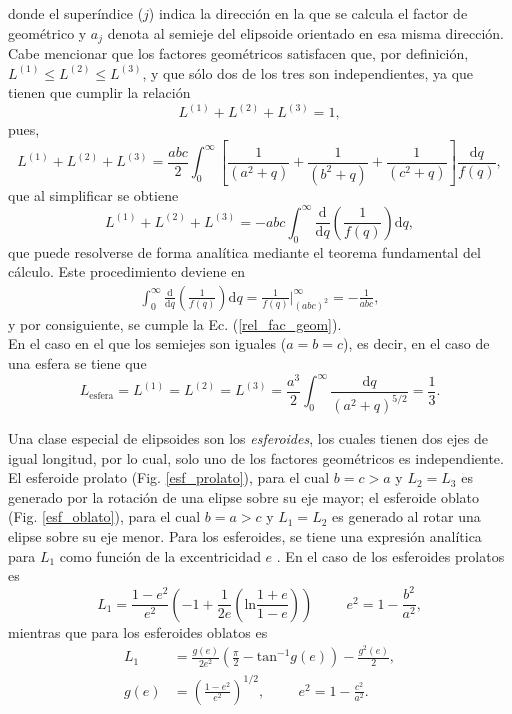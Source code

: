 donde el superíndice ($j$) indica la dirección en la que se calcula el factor de geométrico y $a_j$ denota al semieje del elipsoide orientado en esa misma dirección. Cabe mencionar que los factores geométricos  satisfacen que, por definición, $L^{(1)}\leq L^{(2)}\leq L^{(3)}$, y que sólo dos de los tres son independientes, ya que tienen que cumplir la relación 
\begin{equation}
    L^{(1)}+L^{(2)}+L^{(3)}=1,
    \label{rel_fac_geom}
\end{equation}
pues, 
\begin{equation*}
	L^{(1)}+L^{(2)}+L^{(3)}=\frac{abc}{2}\int_0^{\infty}\left[\frac{1}{(a^2+q)}+\frac{1}{(b^2+q)}+\frac{1}{(c^2+q)}\right]\frac{\text{d}q}{f(q)},
\end{equation*}
que al simplificar se obtiene
$$L^{(1)}+L^{(2)}+L^{(3)}=-abc\int_0^{\infty}\frac{\text{d}}{\text{d}q}\left(\frac{1}{f(q)}\right)\text{d}q,$$
que puede resolverse de forma analítica mediante el teorema fundamental del cálculo. Este procedimiento deviene en
\begin{align*}
	\int_0^{\infty}\frac{\text{d}}{\text{d}q}\left(\frac{1}{f(q)}\right)\text{d}q=\frac{1}{f(q)}\Big|_{(abc)^2}^{\infty}=-\frac{1}{abc},
\end{align*}
y por consiguiente, se cumple la Ec. (\ref{rel_fac_geom}).\\

\noindent En el caso en el que los semiejes son iguales ($a=b=c$), es decir, en el caso de una esfera se tiene que
\begin{equation*}
    L_{\text{esfera}}=L^{(1)}=L^{(2)}=L^{(3)}=\frac{a^3}{2}\int_0^{\infty}\frac{\text{d}q}{(a^2+q)^{5/2}}=\frac{1}{3}.
\end{equation*}

Una clase especial de elipsoides son los \textit{esferoides}, los cuales tienen dos ejes de igual longitud, por lo cual, solo uno de los factores geométricos es independiente. El esferoide prolato (Fig. \ref{esf_prolato}), para el cual $b=c>a$ y $L_2=L_3$ es generado por la rotación de una elipse sobre su eje mayor; el esferoide oblato (Fig. \ref{esf_oblato}), para el cual $b=a>c$ y $L_1=L_2$ es generado al rotar una elipse sobre su eje menor. Para los esferoides, se tiene una expresión analítica para $L_1$ como función de la excentricidad $e$ \cite{Bohren}. En el caso de los esferoides prolatos es
\begin{equation}
	L_1=\frac{1-e^2}{e^2}\left(-1+\frac{1}{2e}\left(\text{ln}\frac{1+e}{1-e}\right)\right)\hspace{1cm}e^2=1-\frac{b^2}{a^2},
\end{equation}
mientras que para los esferoides oblatos es
    \begin{align}
        L_1&=\frac{g(e)}{2e^2}\left(\frac{\pi}{2}-\mbox{tan}^{-1}g(e)\right)-\frac{g^2(e)}{2},\\
        g(e)&=\left(\frac{1-e^2}{e^2}\right)^{1/2},\hspace{1cm}e^2=1-\frac{c^2}{a^2}.
    \end{align}

